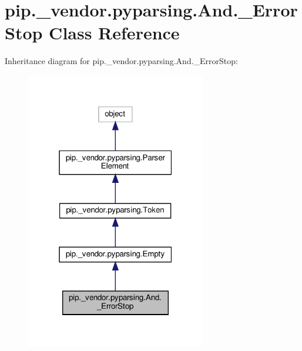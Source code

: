 \hypertarget{classpip_1_1__vendor_1_1pyparsing_1_1And_1_1__ErrorStop}{}\section{pip.\+\_\+vendor.\+pyparsing.\+And.\+\_\+\+Error\+Stop Class Reference}
\label{classpip_1_1__vendor_1_1pyparsing_1_1And_1_1__ErrorStop}


Inheritance diagram for pip.\+\_\+vendor.\+pyparsing.\+And.\+\_\+\+Error\+Stop\+:
\nopagebreak
\begin{figure}[H]
\begin{center}
\leavevmode
\includegraphics[width=223pt]{classpip_1_1__vendor_1_1pyparsing_1_1And_1_1__ErrorStop__inherit__graph}
\end{center}
\end{figure}


